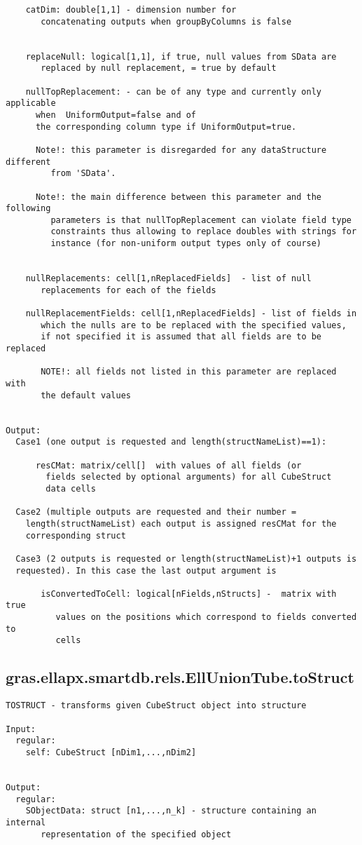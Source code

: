 \begin{verbatim}
    catDim: double[1,1] - dimension number for
       concatenating outputs when groupByColumns is false


    replaceNull: logical[1,1], if true, null values from SData are
       replaced by null replacement, = true by default

    nullTopReplacement: - can be of any type and currently only applicable
      when  UniformOutput=false and of
      the corresponding column type if UniformOutput=true.

      Note!: this parameter is disregarded for any dataStructure different
         from 'SData'.

      Note!: the main difference between this parameter and the following
         parameters is that nullTopReplacement can violate field type
         constraints thus allowing to replace doubles with strings for
         instance (for non-uniform output types only of course)


    nullReplacements: cell[1,nReplacedFields]  - list of null
       replacements for each of the fields

    nullReplacementFields: cell[1,nReplacedFields] - list of fields in
       which the nulls are to be replaced with the specified values,
       if not specified it is assumed that all fields are to be replaced

       NOTE!: all fields not listed in this parameter are replaced with
       the default values


Output:
  Case1 (one output is requested and length(structNameList)==1):

      resCMat: matrix/cell[]  with values of all fields (or
        fields selected by optional arguments) for all CubeStruct
        data cells

  Case2 (multiple outputs are requested and their number =
    length(structNameList) each output is assigned resCMat for the
    corresponding struct

  Case3 (2 outputs is requested or length(structNameList)+1 outputs is
  requested). In this case the last output argument is

       isConvertedToCell: logical[nFields,nStructs] -  matrix with true
          values on the positions which correspond to fields converted to
          cells
\end{verbatim}
\subsection{\texorpdfstring{gras.ellapx.smartdb.rels.EllUnionTube.toStruct}{toStruct}}\label{method:gras.ellapx.smartdb.rels.EllUnionTube.toStruct}
\begin{verbatim}
TOSTRUCT - transforms given CubeStruct object into structure

Input:
  regular:
    self: CubeStruct [nDim1,...,nDim2]


Output:
  regular:
    SObjectData: struct [n1,...,n_k] - structure containing an internal
       representation of the specified object
\end{verbatim}
